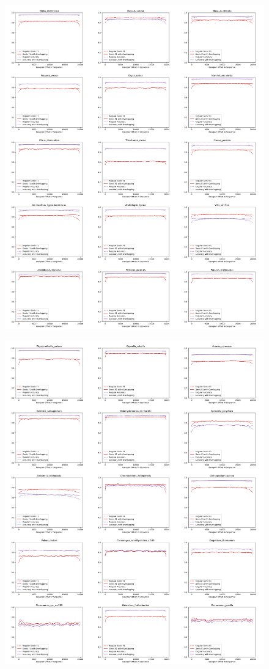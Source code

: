 \documentclass{article}
\begin{document}
\begin{figure}[!h]
\centerline{\includegraphics[width=1.2\textwidth]{images/overlapping/montage_plants2}}
\end{figure}
\begin{figure}[!h]
\centerline{\includegraphics[width=1.2\textwidth]{images/overlapping/montage_plants3}}
\end{figure}
\end{document}
